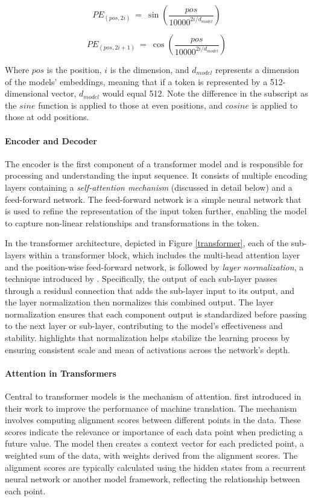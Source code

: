 \documentclass[12pt,a4paper]{article}
\begin{document}
\begin{equation}
  PE_{(pos,2i)}\ =\ \sin\left(\frac{pos}{10000^{2i/d_{model}}}\right)
\end{equation}

\begin{equation}
  PE_{(pos,2i+1)}\ =\ \cos\left(\frac{pos}{10000^{2i/d_{model}}}\right)
\end{equation}

Where $pos$ is the position, $i$ is the dimension, and $d_{model}$ represents a dimension of the models’ embeddings, meaning that if a token is represented by a 512-dimensional vector, $d_{model}$ would equal 512. Note the difference in the subscript as the $sine$ function is applied to those at even positions, and $cosine$ is applied to those at odd positions. 

\paragraph{Encoder and Decoder}
The encoder is the first component of a transformer model and is responsible for processing and understanding the input sequence. It consists of multiple encoding layers containing a \textit{self-attention mechanism} (discussed in detail below) and a feed-forward network. The feed-forward network is a simple neural network that is used to refine the representation of the input token further, enabling the model to capture non-linear relationships and transformations in the token. 

In the transformer architecture, depicted in Figure \ref{transformer}, each of the sub-layers within a transformer block, which includes the multi-head attention layer and the position-wise feed-forward network, is followed by \textit{layer normalization}, a technique introduced by \cite{ba2016layer}. Specifically, the output of each sub-layer passes through a residual connection that adds the sub-layer input to its output, and the layer normalization then normalizes this combined output. The layer normalization ensures that each component output is standardized before passing to the next layer or sub-layer, contributing to the model's effectiveness and stability. \cite{Vaswani2017} highlights that normalization helps stabilize the learning process by ensuring consistent scale and mean of activations across the network's depth. 

\paragraph{Attention in Transformers}
Central to transformer models is the mechanism of attention. \cite{bahdanau2016neural} first introduced in their work to improve the performance of machine translation. The mechanism involves computing alignment scores between different points in the data. These scores indicate the relevance or importance of each data point when predicting a future value. The model then creates a context vector for each predicted point, a weighted sum of the data, with weights derived from the alignment scores. The alignment scores are typically calculated using the hidden states from a recurrent neural network or another model framework, reflecting the relationship between each point.
\end{document}
